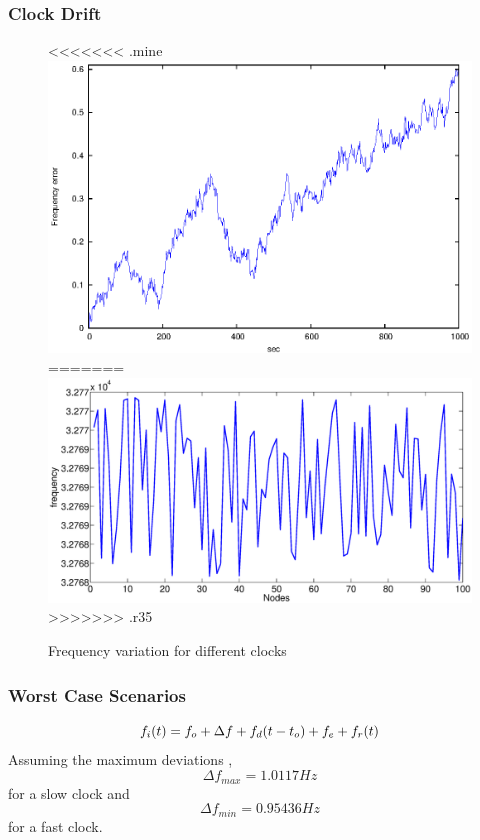 \documentclass[t]{beamer}
\begin{document}
\begin{frame}
\frametitle{Clock Drift}
\begin{figure}
\centering
<<<<<<< .mine
\includegraphics[width= 0.75 \textwidth]{freq_var}
=======
\includegraphics[width= 0.75 \textwidth]{frequency_error}
>>>>>>> .r35
\caption{Frequency variation for different clocks}
\end{figure}
\end{frame}


\begin{frame}
\frametitle{Worst Case Scenarios}
\begin{equation}
    \centering
f_i(t) = f_o + \Delta f + f_d(t-t_o) + f_e + f_r(t)
\end{equation}
Assuming the maximum deviations ,
\begin{equation}
\Delta f_{max} = 1.0117 Hz
\end{equation}
for a slow clock and
\begin{equation}
 \Delta f_{min} = 0.95436 Hz
\end{equation}
for a fast clock.
\end{frame}
\end{document}

